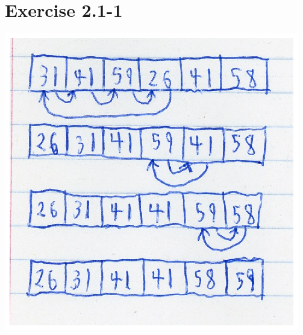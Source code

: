 \documentclass{article}
\begin{document}
\section*{Exercise 2.1-1}

\protect\includegraphics{images/e2_1-1_visualization.ps}
\end{document}
